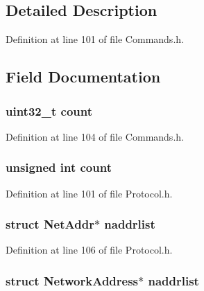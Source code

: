 \subsection{Detailed Description}


Definition at line 101 of file Commands.h.



\subsection{Field Documentation}
\hypertarget{struct_cmd_addr_a86988a65e0d3ece7990c032c159786d6}{
\subsubsection[{count}]{\setlength{\rightskip}{0pt plus 5cm}uint32\_\-t {\bf count}}}
\label{struct_cmd_addr_a86988a65e0d3ece7990c032c159786d6}


Definition at line 104 of file Commands.h.

\hypertarget{struct_cmd_addr_a16ff2d8e15ade4948398b0aeb80124a8}{
\subsubsection[{count}]{\setlength{\rightskip}{0pt plus 5cm}unsigned int {\bf count}}}
\label{struct_cmd_addr_a16ff2d8e15ade4948398b0aeb80124a8}


Definition at line 101 of file Protocol.h.

\hypertarget{struct_cmd_addr_a65d94e910a546e06b09f1daa9978e52c}{
\subsubsection[{naddrlist}]{\setlength{\rightskip}{0pt plus 5cm}struct {\bf NetAddr}$\ast$ {\bf naddrlist}}}
\label{struct_cmd_addr_a65d94e910a546e06b09f1daa9978e52c}


Definition at line 106 of file Protocol.h.

\hypertarget{struct_cmd_addr_a39e0b80e0408806939286dfb40cfd081}{
\subsubsection[{naddrlist}]{\setlength{\rightskip}{0pt plus 5cm}struct {\bf NetworkAddress}$\ast$ {\bf naddrlist}}}
\label{struct_cmd_addr_a39e0b80e0408806939286dfb40cfd081}



